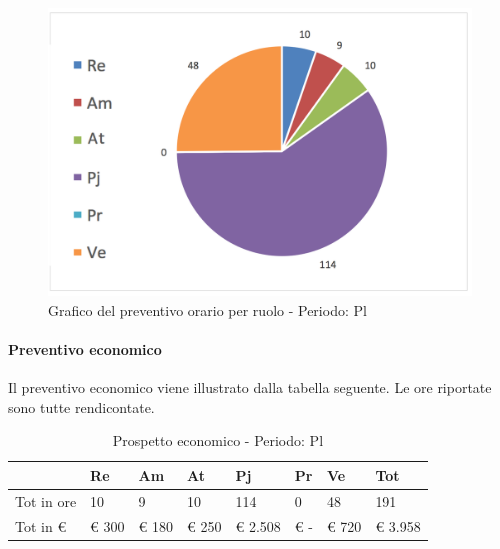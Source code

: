 			\begin{figure}[H]
			\centering
			\includegraphics[scale=0.35]{img/h_r_Pl}
			\caption{Grafico del preventivo orario per ruolo - Periodo: Pl}
			\label{fig:h_r_Pl"}
			\end{figure}

			\newpage
			\paragraph{Preventivo economico}
			Il preventivo economico viene illustrato dalla tabella seguente. Le ore riportate sono tutte rendicontate.\\


							\begin{table}[H] \begin{center} \begin{tabular}{llllllll}
							\toprule
								&	\textbf{Re}	&	\textbf{Am}	&	\textbf{At}	&	\textbf{Pj}	&	\textbf{Pr}	&	\textbf{Ve}	&	\textbf{Tot}\\

							\midrule
							Tot in ore	&	10	&	9	&	10	&	114	&	0	&	48	&	191	 \\


							Tot in €	&	 €     300 	 & 	 €      180 	 & 	 €     250 	 & 	 €  2.508 	 & 	 €        -   	 & 	 €     720 	 & 	 €     3.958 	 \\
							\bottomrule
							\end{tabular} \end{center} \caption{Prospetto economico - Periodo:
							Pl
							}\label{tab:s_Pl} \end{table}


